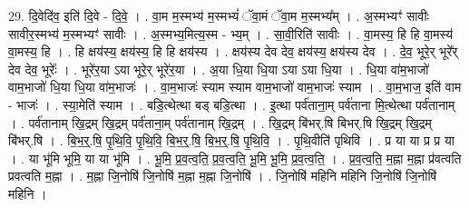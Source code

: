 \documentclass[17pt]{extarticle}
\begin{document}
29. दि॒वेदि॑व॒ इति॑ दि॒वे - दि॒वे॒ । . वा॒म म॒स्मभ्य॑ म॒स्मभ्यं॑ ॅवा॒मं ॅवा॒म म॒स्मभ्य᳚म् । . अ॒स्मभ्यꣳ॑ सावीः सावीर॒स्मभ्य॑ म॒स्मभ्यꣳ॑ सावीः । . अ॒स्मभ्य॒मित्य॒स्म - भ्य॒म् । . सा॒वी॒रिति॑ सावीः । . वा॒मस्य॒ हि हि वा॒मस्य॑ वा॒मस्य॒ हि । . हि क्षय॑स्य॒ क्षय॑स्य॒ हि हि क्षय॑स्य । . क्षय॑स्य देव देव॒ क्षय॑स्य॒ क्षय॑स्य देव । . दे॒व॒ भूरे॒र् भूरे᳚र् देव देव॒ भूरेः᳚ । . भूरे॑र॒या ऽया भूरे॒र् भूरे॑र॒या । . अ॒या धि॒या धि॒या ऽया ऽया धि॒या । . धि॒या वा॑म॒भाजो॑ वाम॒भाजो॑ धि॒या धि॒या वा॑म॒भाजः॑ । . वा॒म॒भाजः॑ स्याम स्याम वाम॒भाजो॑ वाम॒भाजः॑ स्याम । . वा॒म॒भाज॒ इति॑ वाम - भाजः॑ । . स्या॒मेति॑ स्याम । . बडि॒त्थेत्था बड् बडि॒त्था । . इ॒त्था पर्व॑ताना॒म् पर्व॑ताना मि॒त्थेत्था पर्व॑तानाम् । . पर्व॑तानाम् खि॒द्रम् खि॒द्रम् पर्व॑ताना॒म् पर्व॑तानाम् खि॒द्रम् । . खि॒द्रम् बि॑भर्.षि बिभर्.षि खि॒द्रम् खि॒द्रम् बि॑भर्.षि । . बि॒भ॒र्॒.षि॒ पृ॒थि॒वि॒ पृ॒थि॒वि॒ बि॒भ॒र्॒.षि॒ बि॒भ॒र्॒.षि॒ पृ॒थि॒वि॒ । . पृ॒थि॒वीति॑ पृथिवि । . प्र या या प्र प्र या । . या भू॑मि भूमि॒ या या भू॑मि । . भू॒मि॒ प्र॒व॒त्व॒ति॒ प्र॒व॒त्व॒ति॒ भू॒मि॒ भू॒मि॒ प्र॒व॒त्व॒ति॒ । . प्र॒व॒त्व॒ति॒ म॒ह्ना म॒ह्ना प्र॑वत्वति प्रवत्वति म॒ह्ना । . म॒ह्ना जि॒नोषि॑ जि॒नोषि॑ म॒ह्ना म॒ह्ना जि॒नोषि॑ । . जि॒नोषि॑ महिनि महिनि जि॒नोषि॑ जि॒नोषि॑ महिनि । \newline
\end{document}
